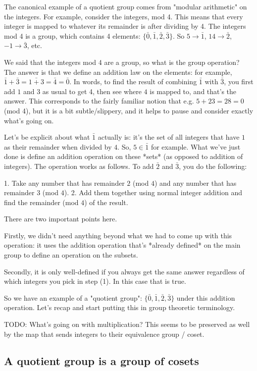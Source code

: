 The canonical example of a quotient group comes from "modular arithmetic" on
the integers. For example, consider the integers, mod 4. This means that every
integer is mapped to whatever its remainder is after dividing by 4. The
integers mod 4 is a group, which contains 4 elements: $\{\bar 0, \bar 1, \bar
2, \bar 3\}$. So $5 \rightarrow \bar 1$, $14 \rightarrow \bar 2$, $-1
\rightarrow \bar 3$, etc.

We said that the integers mod 4 are a group, so what is the group operation?
The answer is that we define an addition law on the elements: for example,
$\bar 1 + \bar 3 = \bar{1 + 3} = \bar 4 = \bar 0$. In words, to find the result
of combining $\bar 1$ with $\bar 3$, you first add $1$ and $3$ as usual to get
4, then see where $4$ is mapped to, and that's the answer. This corresponds to
the fairly familiar notion that e.g. $5 + 23 = 28 = 0$ (mod 4), but it is a bit
subtle/slippery, and it helps to pause and consider exactly what's going on.

Let's be explicit about what $\bar 1$ actually is: it's the set of all integers
that have $1$ as their remainder when divided by $4$. So, $5 \in \bar 1$ for
example. What we've just done is define an addition operation on these *sets*
(as opposed to addition of integers). The operation works as follows. To add
$\bar 2$ and $\bar 3$, you do the following:

1. Take any number that has remainder $2$ (mod $4$) and any number that has
   remainder $3$ (mod $4$).
2. Add them together using normal integer addition and find the remainder (mod
   $4$) of the result.

There are two important points here.

Firstly, we didn't need anything beyond what we had to come up with this
operation: it uses the addition operation that's *already defined* on the main
group to define an operation on the subsets.

Secondly, it is only well-defined if you always get the same answer regardless
of which integers you pick in step (1). In this case that is true.

So we have an example of a "quotient group": $\{\bar 0, \bar 1, \bar 2, \bar
3\}$ under this addition operation. Let's recap and start putting this in group
theoretic terminology.

TODO: What's going on with multiplication? This seems to be preserved as well
by the map that sends integers to their equivalence group / coset.

\subsection{A quotient group is a group of cosets}

